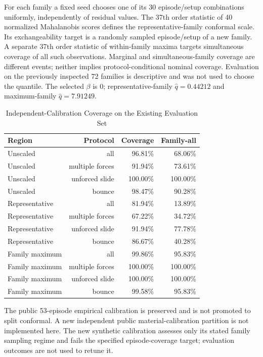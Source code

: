 For each family a fixed seed chooses one of its 30 episode/setup combinations uniformly, independently of residual values. The 37th order statistic of 40 normalized Mahalanobis scores defines the representative-family conformal scale. Its exchangeability target is a randomly sampled episode/setup of a new family. A separate 37th order statistic of within-family maxima targets simultaneous coverage of all such observations. Marginal and simultaneous-family coverage are different events; neither implies protocol-conditional nominal coverage. Evaluation on the previously inspected 72 families is descriptive and was not used to choose the quantile.
The selected $\beta$ is 0; representative-family $\hat q=0.44212$ and maximum-family $\hat q=7.91249$.

\begin{table}[htbp]\centering\small
\caption{Independent-Calibration Coverage on the Existing Evaluation Set}\label{tab:fu_cal}
\begin{tabular}{lrrr}\toprule
Region & Protocol & Coverage & Family-all\\\midrule
Unscaled & all & 96.81\% & 68.06\%\\
Unscaled & multiple forces & 91.94\% & 73.61\%\\
Unscaled & unforced slide & 100.00\% & 100.00\%\\
Unscaled & bounce & 98.47\% & 90.28\%\\
Representative & all & 81.94\% & 13.89\%\\
Representative & multiple forces & 67.22\% & 34.72\%\\
Representative & unforced slide & 91.94\% & 77.78\%\\
Representative & bounce & 86.67\% & 40.28\%\\
Family maximum & all & 99.86\% & 95.83\%\\
Family maximum & multiple forces & 100.00\% & 100.00\%\\
Family maximum & unforced slide & 100.00\% & 100.00\%\\
Family maximum & bounce & 99.58\% & 95.83\%\\
\bottomrule\end{tabular}
\end{table}
The public 53-episode empirical calibration is preserved and is not promoted to split conformal. A new independent public material-calibration partition is not implemented here. The new synthetic calibration assesses only its stated family sampling regime and fails the specified episode-coverage target; evaluation outcomes are not used to retune it.
